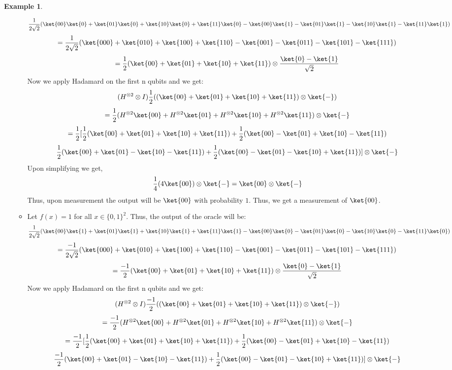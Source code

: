 \documentclass[12pt, oneside]{book}
\theoremstyle{definition}
\theoremstyle{definition}
\newtheorem{example}{Example}[section]
\theoremstyle{remark}
\begin{document}
\begin{example}
\begin{enumerate}
\begin{itemize}
            \[
                \frac{1}{2\sqrt{2}}(\ket{00}\ket{0}+\ket{01}\ket{0}+\ket{10}\ket{0}+\ket{11}\ket{0}-\ket{00}\ket{1}-\ket{01}\ket{1}-\ket{10}\ket{1}-\ket{11}\ket{1})
            \]
            \[
            =\frac{1}{2\sqrt{2}}(\ket{000}+\ket{010}+\ket{100}+\ket{110}-\ket{001}-\ket{011}-\ket{101}-\ket{111})
            \]
            \[
            =\frac{1}{2}(\ket{00}+\ket{01}+\ket{10}+\ket{11})\otimes \frac{\ket{0}-\ket{1}}{\sqrt{2}}
            \]
            Now we apply Hadamard on the first n qubits and we get:
            \[
                (H^{\otimes 2}\otimes I)\frac{1}{2}((\ket{00}+\ket{01}+\ket{10}+\ket{11})\otimes \ket{-})
            \]
            \[
                =\frac{1}{2}(H^{\otimes 2}\ket{00}+H^{\otimes 2}\ket{01}+H^{\otimes 2}\ket{10}+H^{\otimes 2}\ket{11})\otimes \ket{-}
            \]
            \[
                =\frac{1}{2}[\frac{1}{2}(\ket{00}+\ket{01}+\ket{10}+\ket{11})+\frac{1}{2}(\ket{00}-\ket{01}+\ket{10}-\ket{11})
            \]
            \[
                \frac{1}{2}(\ket{00}+\ket{01}-\ket{10}-\ket{11})+\frac{1}{2}(\ket{00}-\ket{01}-\ket{10}+\ket{11})]\otimes \ket{-}
            \]
            Upon simplifying we get,
            \[
                \frac{1}{4}(4\ket{00})\otimes \ket{-}=\ket{00}\otimes \ket{-}
            \]
            Thus, upon measurement the output will be $\ket{00}$ with probability $1$. Thus, we get a measurement of $\ket{00}$.
            \item Let $f(x)=1$ for all $x \in \{0,1\}^2$. Thus, the output of the oracle will be:
            \[
                \frac{1}{2\sqrt{2}}(\ket{00}\ket{1}+\ket{01}\ket{1}+\ket{10}\ket{1}+\ket{11}\ket{1}-\ket{00}\ket{0}-\ket{01}\ket{0}-\ket{10}\ket{0}-\ket{11}\ket{0})
            \]
            \[
            =\frac{-1}{2\sqrt{2}}(\ket{000}+\ket{010}+\ket{100}+\ket{110}-\ket{001}-\ket{011}-\ket{101}-\ket{111})
            \]
            \[
            =\frac{-1}{2}(\ket{00}+\ket{01}+\ket{10}+\ket{11})\otimes \frac{\ket{0}-\ket{1}}{\sqrt{2}}
            \]
            Now we apply Hadamard on the first n qubits and we get:
            \[
                (H^{\otimes 2}\otimes I)\frac{-1}{2}((\ket{00}+\ket{01}+\ket{10}+\ket{11})\otimes \ket{-})
            \]
            \[
                =\frac{-1}{2}(H^{\otimes 2}\ket{00}+H^{\otimes 2}\ket{01}+H^{\otimes 2}\ket{10}+H^{\otimes 2}\ket{11})\otimes \ket{-}
            \]
            \[
                =\frac{-1}{2}[\frac{1}{2}(\ket{00}+\ket{01}+\ket{10}+\ket{11})+\frac{1}{2}(\ket{00}-\ket{01}+\ket{10}-\ket{11})
            \]
            \[
                \frac{-1}{2}(\ket{00}+\ket{01}-\ket{10}-\ket{11})+\frac{1}{2}(\ket{00}-\ket{01}-\ket{10}+\ket{11})]\otimes \ket{-}
\]
\end{itemize}
\end{enumerate}
\end{example}
\end{document}
